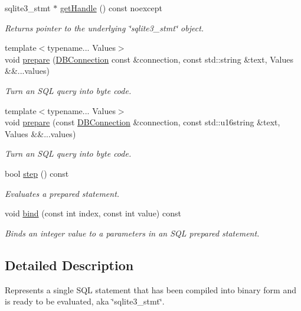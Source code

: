 \begin{DoxyCompactItemize}
\item 
\hypertarget{a00008_a9052c143879aca6cf253925336464a8b}{sqlite3\-\_\-stmt $\ast$ \hyperlink{a00008_a9052c143879aca6cf253925336464a8b}{get\-Handle} () const noexcept}\label{a00008_a9052c143879aca6cf253925336464a8b}

\begin{DoxyCompactList}\small\item\em Returns pointer to the underlying \char`\"{}sqlite3\-\_\-stmt\char`\"{} object. \end{DoxyCompactList}\item 
{\footnotesize template$<$typename... Values$>$ }\\void \hyperlink{a00008_a1ecd8e2636b542314521eb68fbf1000e}{prepare} (\hyperlink{a00002}{D\-B\-Connection} const \&connection, const std\-::string \&text, Values \&\&...values)
\begin{DoxyCompactList}\small\item\em Turn an S\-Q\-L query into byte code. \end{DoxyCompactList}\item 
{\footnotesize template$<$typename... Values$>$ }\\void \hyperlink{a00008_a0d422eadca4b2e3f2e1b6e13af69f3cc}{prepare} (const \hyperlink{a00002}{D\-B\-Connection} \&connection, const std\-::u16string \&text, Values \&\&...values)
\begin{DoxyCompactList}\small\item\em Turn an S\-Q\-L query into byte code. \end{DoxyCompactList}\item 
bool \hyperlink{a00008_a6251d1119e978d1366113b4aa30899ef}{step} () const 
\begin{DoxyCompactList}\small\item\em Evaluates a prepared statement. \end{DoxyCompactList}\item 
void \hyperlink{a00008_a0d4999fce90145852287c18c0d218ac6}{bind} (const int index, const int value) const 
\begin{DoxyCompactList}\small\item\em Binds an integer value to a parameters in an S\-Q\-L prepared statement. \end{DoxyCompactList}\end{DoxyCompactItemize}


\subsection{Detailed Description}
Represents a single S\-Q\-L statement that has been compiled into binary form and is ready to be evaluated, aka \char`\"{}sqlite3\-\_\-stmt\char`\"{}. 

